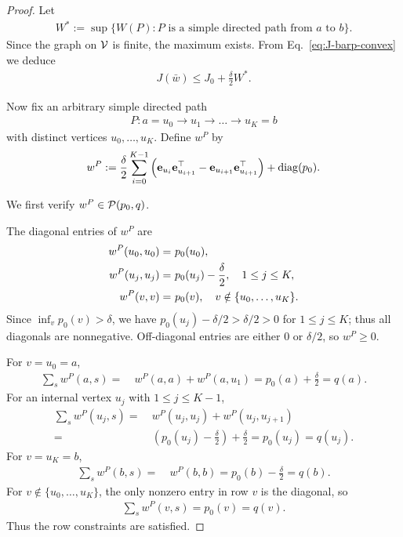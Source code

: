 \begin{proof}
Let
\begin{align}
    W^* := \sup\{W(P): P \text{ is a simple directed path from }a\text{ to }b\}.
    \label{eq:W-star-def}
\end{align}
Since the graph on $\mathcal{V}$ is finite, the maximum exists.
From Eq.~\eqref{eq:J-barp-convex} we deduce
\begin{align}
    J(\bar w)
    \le J_0 + \frac{\delta}{2} W^*.
    \label{eq:J-barp-upper}
\end{align}


Now fix an arbitrary simple directed path
\begin{align*}
    P: a=u_0 \to u_1 \to \dots \to u_K = b
\end{align*}
with distinct vertices $u_0,\dots,u_K$.
Define $w^P$ by
\begin{align}
    w^P
    := \frac{\delta}{2}\sum_{i=0}^{K-1}
        \left(\mathbf{e}_{u_i}\mathbf{e}_{u_{i+1}}^\top
              - \mathbf{e}_{u_{i+1}}\mathbf{e}_{u_{i+1}}^\top\right)
       + \mathrm{diag}(p_0).
    \label{eq:pP-def}
\end{align}

We first verify $w^P\in\mathcal{P}(p_0,q)$.

The diagonal entries of $w^P$ are
\begin{align}
    w^P(u_0,u_0) = &~ p_0(u_0), \notag\\
    w^P(u_j,u_j) = &~ p_0(u_j) - \frac{\delta}{2}, \quad 1\le j\le K,
       \label{eq:pP-diag}\\
    w^P(v,v) = &~ p_0(v), \quad v\notin\{u_0,\dots,u_K\}. \notag
\end{align}
Since $\inf_v p_0(v)>\delta$, we have
$p_0(u_j)-\delta/2 > \delta/2>0$ for $1\le j\le K$; thus all diagonals are
nonnegative.
Off-diagonal entries are either $0$ or $\delta/2$, so $w^P\ge0$.

For $v=u_0=a$,
\begin{align*}
    \sum_s w^P(a,s)
    = &~ w^P(a,a) + w^P(a,u_1)
     = p_0(a) + \frac{\delta}{2}
     = q(a).
\end{align*}
For an internal vertex $u_j$ with $1\le j\le K-1$,
\begin{align*}
    \sum_s w^P(u_j,s)
    = &~ w^P(u_j,u_j) + w^P(u_j,u_{j+1})\\
    = &~ \left(p_0(u_j)-\frac{\delta}{2}\right) + \frac{\delta}{2}
     = p_0(u_j) = q(u_j).
\end{align*}
For $v=u_K=b$,
\begin{align*}
    \sum_s w^P(b,s)
    = &~ w^P(b,b)
     = p_0(b)-\frac{\delta}{2}
     = q(b).
\end{align*}
For $v\notin\{u_0,\dots,u_K\}$, the only nonzero entry in row $v$ is the
diagonal, so
\begin{align*}
    \sum_s w^P(v,s) = p_0(v) = q(v).
\end{align*}
Thus the row constraints are satisfied.


\end{proof}
